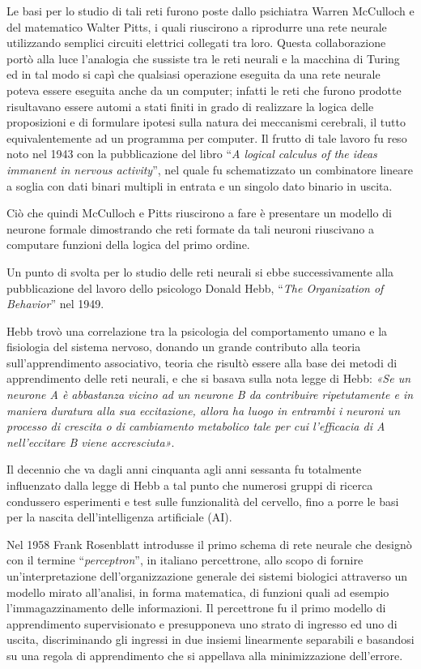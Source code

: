 \documentclass[12pt,a4paper,oneside]{book}
\begin{document}
	    Le basi per lo studio di tali reti furono poste dallo psichiatra Warren McCulloch e del matematico Walter Pitts, i quali riuscirono a riprodurre una rete neurale utilizzando semplici circuiti elettrici collegati tra loro. Questa collaborazione portò alla luce l'analogia che sussiste tra le reti neurali e la macchina di Turing ed in tal modo si capì che qualsiasi operazione eseguita da una rete neurale poteva essere eseguita anche da un computer; infatti le reti che furono prodotte risultavano essere automi a stati finiti in grado di realizzare la logica delle proposizioni e di formulare ipotesi sulla natura dei meccanismi cerebrali, il tutto equivalentemente ad un programma per computer.
	    Il frutto di tale lavoro fu reso noto nel 1943 con la pubblicazione del libro ``\emph{A logical calculus of the ideas immanent in nervous activity}'', nel quale fu schematizzato un combinatore lineare a soglia con dati binari multipli in entrata e un singolo dato binario in uscita.
	    
	    Ciò che quindi McCulloch e Pitts riuscirono a fare è presentare un modello di neurone formale dimostrando che reti formate da tali neuroni riuscivano a computare funzioni della logica del primo ordine.
	    
	    Un punto di svolta per lo studio delle reti neurali si ebbe successivamente alla pubblicazione del lavoro dello psicologo Donald Hebb, ``\emph{The Organization of Behavior}'' nel 1949.
	     
	    Hebb trovò una correlazione tra la psicologia del comportamento umano e la fisiologia del sistema nervoso, donando un grande contributo alla teoria sull'apprendimento associativo, teoria che risultò essere alla base dei metodi di apprendimento delle reti neurali, e che si basava sulla nota legge di Hebb: \textit{«Se un neurone A è abbastanza vicino ad un neurone B da contribuire ripetutamente e in maniera duratura alla sua eccitazione, allora ha luogo in entrambi i neuroni un processo di crescita o di cambiamento metabolico tale per cui l'efficacia di A nell'eccitare B viene accresciuta»}.
	    
	    Il decennio che va dagli anni cinquanta agli anni sessanta fu totalmente influenzato dalla legge di Hebb a tal punto che numerosi gruppi di ricerca condussero esperimenti e test sulle funzionalità del cervello, fino a porre le basi per la nascita dell'intelligenza artificiale (AI).
	
		Nel 1958 Frank Rosenblatt introdusse il primo schema di rete neurale che designò con il termine ``\emph{perceptron}'', in italiano percettrone, allo scopo di fornire un'interpretazione dell'organizzazione generale dei sistemi biologici attraverso un modello mirato all'analisi, in forma matematica, di funzioni quali ad esempio l'immagazzinamento delle informazioni. Il percettrone fu il primo modello di apprendimento supervisionato e presupponeva uno strato di ingresso ed uno di uscita, discriminando gli ingressi in due insiemi linearmente separabili e basandosi su una regola di apprendimento che si appellava alla minimizzazione dell'errore.
		
\end{document}
